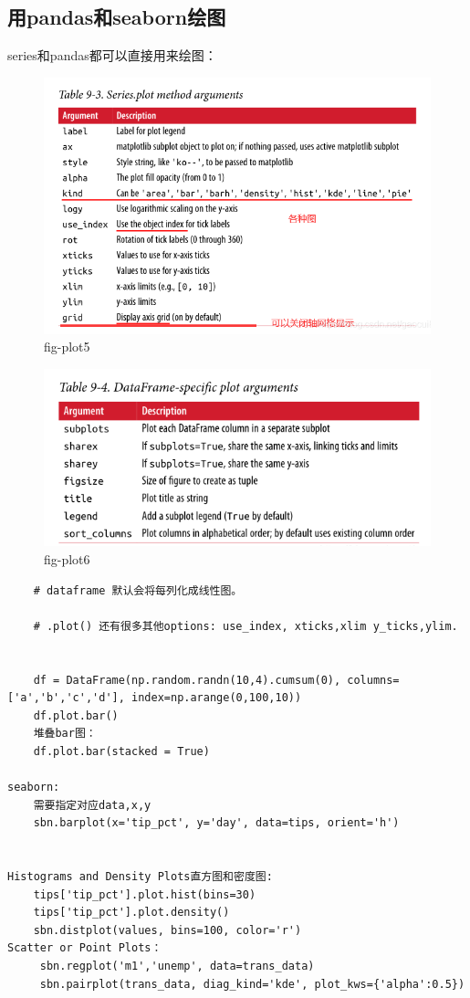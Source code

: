 \documentclass{article}
\begin{document}
\subsection{用pandas和seaborn绘图}
series和pandas都可以直接用来绘图：
\begin{figure}[tbhp]
	\centering
	\includegraphics[width=\linewidth]{fig/p5}
	\caption{fig-plot5}
	\label{fig-shili5}
\end{figure}
\begin{figure}[tbhp]
	\centering
	\includegraphics[width=\linewidth]{fig/p6}
	\caption{fig-plot6}
	\label{fig-shili6}
\end{figure}

\begin{lstlisting}
	# dataframe 默认会将每列化成线性图。
	
	# .plot() 还有很多其他options: use_index, xticks,xlim y_ticks,ylim.
	
	
	df = DataFrame(np.random.randn(10,4).cumsum(0), columns=['a','b','c','d'], index=np.arange(0,100,10))
	df.plot.bar()
	堆叠bar图：
	df.plot.bar(stacked = True)
	
seaborn:
	需要指定对应data,x,y
	sbn.barplot(x='tip_pct', y='day', data=tips, orient='h')
	
	
Histograms and Density Plots直方图和密度图:
	tips['tip_pct'].plot.hist(bins=30)
	tips['tip_pct'].plot.density()
	sbn.distplot(values, bins=100, color='r')
Scatter or Point Plots：
	 sbn.regplot('m1','unemp', data=trans_data)	
	 sbn.pairplot(trans_data, diag_kind='kde', plot_kws={'alpha':0.5})
\end{lstlisting}
\end{document}
